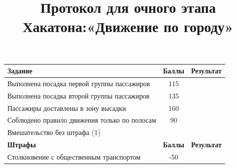 \documentclass[12pt]{article}
\date{} %
\title{Протокол для очного этапа \\ Хакатона:«Движение по городу»}
\newcommand{\penaltyBusPoints}{\color{red}-50}
\newcommand{\boardingPassangersFirstZone}{115}
\newcommand{\boardingPassangersSecondZone}{135}
\newcommand{\passangersDelievery}{160}
\newcommand{\complianceTrafficRules}{90}
\begin{document}
\maketitle
\thispagestyle{empty}
\vspace*{-2cm}


\renewcommand{\arraystretch}{1}
\vspace*{0.25cm}
\begin{tabularx}{\textwidth}{|X|c|p{2cm}|}
    \hline
    \textbf{Задание} & \textbf{Баллы} & \textbf{Результат}\\
    \hline
    Выполнена посадка первой группы пассажиров & \boardingPassangersFirstZone &  \\
    \hline
    Выполнена посадка второй группы пассажиров & \boardingPassangersSecondZone & \\
    \hline
    Пассажиры доставлены в зону высадки & \passangersDelievery & \\
    \hline 
    Соблюдено правило движения только по полосам & \complianceTrafficRules & \\
    \hline
    Вмешательство без штрафа (1) &  & \\
    \hline
    \textbf{Штрафы} & \textbf{Баллы} & \textbf{Результат} \\
    \hline
    Столкновение с общественным транспортом & \penaltyBusPoints &  \\
    \hline
\end{tabularx}
\vspace*{0.25cm}
\end{document}
